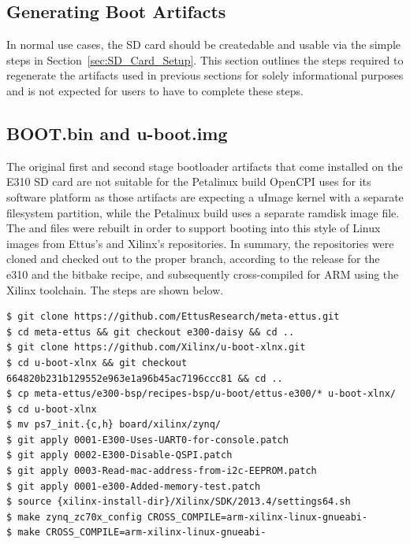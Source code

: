\begin{appendices}
\section{Generating Boot Artifacts}
\label{app:sd_card}
In normal use cases, the SD card should be createdable and usable via the simple steps in Section~\ref{sec:SD_Card_Setup}. This section outlines the steps required to regenerate the artifacts used in previous sections for solely informational purposes and is not expected for users to have to complete these steps.
\subsection{BOOT.bin and u-boot.img}
The original first and second stage bootloader artifacts that come installed on the E310 SD card are not suitable for the Petalinux build OpenCPI uses for its software platform as those artifacts are expecting a uImage kernel with a separate filesystem partition, while the Petalinux build uses a separate ramdisk image file. The  and  files were rebuilt in order to support booting into this style of Linux images from Ettus's and Xilinx's repositories. In summary, the repositories were cloned and checked out to the proper branch, according to the release for the e310 and the bitbake recipe, and subsequently cross-compiled for ARM using the Xilinx toolchain. The steps are shown below.
\begin{lstlisting}[showspaces=false]
$ git clone https://github.com/EttusResearch/meta-ettus.git
$ cd meta-ettus && git checkout e300-daisy && cd ..
$ git clone https://github.com/Xilinx/u-boot-xlnx.git
$ cd u-boot-xlnx && git checkout 664820b231b129552e963e1a96b45ac7196ccc81 && cd ..
$ cp meta-ettus/e300-bsp/recipes-bsp/u-boot/ettus-e300/* u-boot-xlnx/
$ cd u-boot-xlnx
$ mv ps7_init.{c,h} board/xilinx/zynq/
$ git apply 0001-E300-Uses-UART0-for-console.patch
$ git apply 0002-E300-Disable-QSPI.patch
$ git apply 0003-Read-mac-address-from-i2c-EEPROM.patch
$ git apply 0001-e300-Added-memory-test.patch
$ source {xilinx-install-dir}/Xilinx/SDK/2013.4/settings64.sh
$ make zynq_zc70x_config CROSS_COMPILE=arm-xilinx-linux-gnueabi-
$ make CROSS_COMPILE=arm-xilinx-linux-gnueabi-
\end{lstlisting}

\end{appendices}
